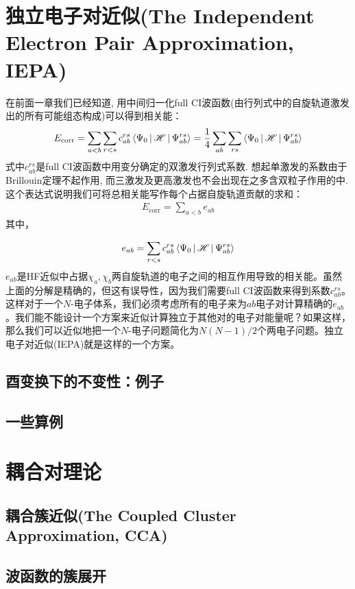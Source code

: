 \section{独立电子对近似(The Independent Electron Pair Approximation, IEPA)}
在前面一章我们已经知道, 
用中间归一化full CI波函数(由\hft 行列式中的自旋轨道激发出的所有可能组态构成)可以得到相关能：
\begin{align}
E_\mathrm{corr} = \sum_{a<b}\sum_{r<s}c_{ab}^{rs}\Braket{\Psi_0|\mathscr{H}|\Psi_{ab}^{rs}} = \frac{1}{4}\sum_{ab}\sum_{rs}\Braket{\Psi_0|\mathscr{H}|\Psi_{ab}^{rs}}
\end{align}
式中$c_{ab}^{rs}$是full CI波函数中用变分确定的双激发行列式系数. 
想起单激发的系数由于Brillouin定理不起作用, 
而三激发及更高激发也不会出现在之多含双粒子作用的\ha 中. 
这个表达式说明我们可将总相关能写作每个占据自旋轨道贡献的求和：
\begin{align}
E_\mathrm{corr} = \sum_{a<b}e_{ab}
\end{align}
其中，

\begin{equation}\label{key}
e_{ab} = \sum_{r<s} c_{ab}^{rs} \Braket{\Psi_0 | \mathscr{H} | \Psi_{ab}^{rs}}
\end{equation}
$ e_{ab} $是HF近似中占据$ \chi_a,\chi_b $两自旋轨道的电子之间的相互作用导致的相关能。虽然上面的分解是精确的，但这有误导性，因为我们需要full CI波函数来得到系数$ c_{ab}^{rs} $。这样对于一个$ N $-电子体系，我们必须考虑所有的电子来为$ ab $电子对计算精确的$ e_{ab} $。我们能不能设计一个方案来近似计算独立于其他对的电子对能量呢？如果这样，那么我们可以近似地把一个$ N $-电子问题简化为$ N(N-1)/2 $个两电子问题。独立电子对近似(IEPA)就是这样的一个方案。
\subsection{酉变换下的不变性：例子}
\subsection{一些算例}

\section{耦合对理论}
\subsection{耦合簇近似(The Coupled Cluster Approximation, CCA)}
\subsection{波函数的簇展开}
